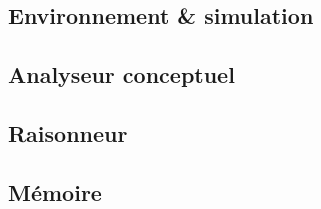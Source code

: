 \subsection{Environnement \& simulation}


\subsection{Analyseur conceptuel}


\subsection{Raisonneur}


\subsection{Mémoire}

